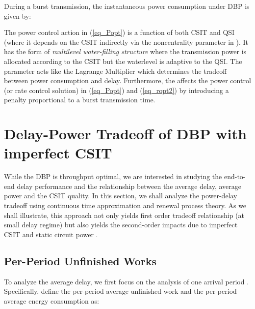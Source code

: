 \documentclass[11pt,journal, onecolumn]{./IEEEtran}
\newcommand{\red}{\color{black}}
\begin{document}
During a burst transmission, the instantaneous power consumption under DBP is given by:



\begin{Remark}
The power control action in (\ref{eq_Popt}) is a function of both CSIT and QSI (where it depends on the CSIT indirectly via the noncentrality parameter  in ). It has the form of \emph{multilevel water-filling structure} where the transmission power is allocated according to the CSIT but the waterlevel is adaptive to the QSI. The parameter  acts like the Lagrange Multiplier which determines the tradeoff between power consumption and delay. Furthermore, the  affects the power control (or rate control solution) in (\ref{eq_Popt}) and (\ref{eq_ropt2}) by introducing a penalty proportional to a burst transmission time. ~\hfill\IEEEQED
\end{Remark}








\section{Delay-Power Tradeoff of DBP with imperfect CSIT}

While the DBP is throughput optimal, we are interested in studying the end-to-end delay performance and the relationship between the average delay, average power and the CSIT quality.
In this section, we shall analyze the power-delay tradeoff using continuous time approximation and renewal process theory. {\red As we shall illustrate, this approach not only yields first order tradeoff relationship (at small delay regime) but also yields the second-order impacts due to imperfect CSIT and static circuit power .}

\subsection{Per-Period Unfinished Works}


To analyze the average delay, we first focus on the analysis of one arrival period . Specifically, define the per-period average unfinished work  and the per-period average energy consumption  as:
\end{document}
